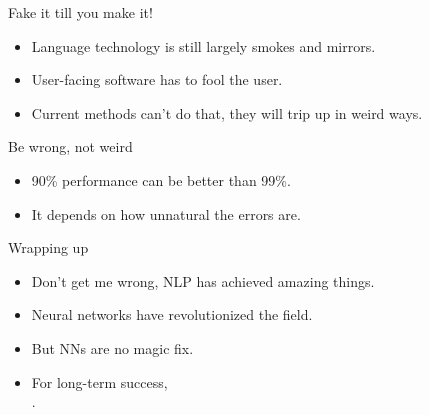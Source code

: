 \documentclass[xcolor={usenames,svgnames,x11names,dvipsnames,table}]{beamer}
\begin{document}
\begin{frame}{Fake it till you make it!}
    \begin{itemize}
        \item Language technology is still largely smokes and mirrors.
        \item User-facing software has to fool the user.
        \item Current methods can't do that, they will trip up in weird ways.
    \end{itemize}

    \begin{block}{Be wrong, not weird}
        \begin{itemize}
            \item 90\% performance can be better than 99\%.
            \item It depends on how unnatural the errors are.
        \end{itemize}
    \end{block}
\end{frame}

\begin{frame}{Wrapping up}
    \begin{itemize}
        \item Don't get me wrong, NLP has achieved amazing things.
        \item Neural networks have revolutionized the field.
        \item But NNs are no magic fix.
        \item For long-term success,\\
              .  \end{itemize}

    \begin{columns}
        \centering
    \end{columns}
\end{frame}
\end{document}

